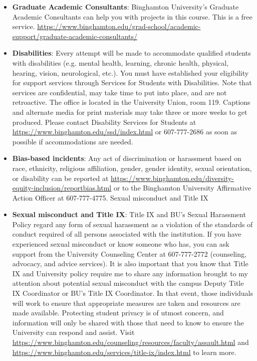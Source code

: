 \documentclass[11pt, a4paper]{article}
\begin{document}
\begin{itemize}
    \item \textbf{Graduate Academic Consultants}: Binghamton University's Graduate Academic Consultants can help you with projects in this course. This is a free service. \url{https://www.binghamton.edu/grad-school/academic-support/graduate-academic-consultants/}
    \item \textbf{Disabilities}: Every attempt will be made to accommodate qualified students with disabilities (e.g. mental health, learning, chronic health, physical, hearing, vision, neurological, etc.). You must have established your eligibility for support services through Services for Students with Disabilities. Note that services are confidential, may take time to put into place, and are not retroactive. The office is located in the University Union, room 119. Captions and alternate media for print materials may take three or more weeks to get produced. Please contact Disability Services for Students at \url{https://www.binghamton.edu/ssd/index.html} or 607-777-2686 as soon as possible if accommodations are needed.
    \item \textbf{Bias-based incidents}: Any act of discrimination or harassment based on race, ethnicity, religious affiliation, gender, gender identity, sexual orientation, or disability can be reported at \url{https://www.binghamton.edu/diversity-equity-inclusion/reportbias.html} or to the Binghamton University Affirmative Action Officer at 607-777-4775.
    Sexual misconduct and Title IX
    \item \textbf{Sexual misconduct and Title IX}: Title IX and BU’s Sexual Harassment Policy regard any form of sexual harassment as a violation of the standards of conduct required of all persons associated with the institution. If you have experienced sexual misconduct or know someone who has, you can ask support from the University Counseling Center at 607-777-2772 (counseling, advocacy, and advice services). It is also important that you know that Title IX and University policy require me to share any information brought to my attention about potential sexual misconduct with the campus Deputy Title IX Coordinator or BU’s Title IX Coordinator. In that event, those individuals will work to ensure that appropriate measures are taken and resources are made available. Protecting student privacy is of utmost concern, and information will only be shared with those that need to know to ensure the University can respond and assist. Visit \url{https://www.binghamton.edu/counseling/resources/faculty/assault.html} and \url{https://www.binghamton.edu/services/title-ix/index.html} to learn more.

\end{itemize}
\end{document}
